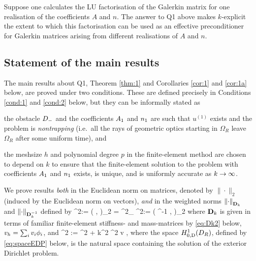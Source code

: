 
Suppose one calculates the LU factorisation of the Galerkin matrix for one realisation of the coefficients $A$ and $n$. The answer to Q1 above makes $k$-explicit the extent to which this factorisation can be used as an effective preconditioner for Galerkin matrices arising from different realisations of $A$ and $n$.

\subsection{Statement of the main results}\label{sec:main}
The main results about Q1, Theorem \ref{thm:1} and Corollaries \ref{cor:1} and \ref{cor:1a} below, are proved under two conditions. These are defined precisely in Conditions \ref{cond:1} and \ref{cond:2} below, but they can be informally stated as 
\bit
\item the obstacle $D_{-}$ and the coefficients $A_{1}$ and $n_{1}$ are such that $u^{(1)}$ exists and the problem is \emph{nontrapping} (i.e.~all the rays of geometric optics starting in $\Omega_R$ leave $\Omega_R$ after some uniform time), and
\item the meshsize $h$ and polynomial degree $p$ in the finite-element method are chosen to depend on $k$ to ensure that the 
finite-element solution to the problem with coefficients $A_{1}$ and $n_{1}$ exists, is unique, and 
is uniformly accurate as $k\rightarrow \infty$. 
\eit 

We prove results \emph{both} in the Euclidean norm on matrices, denoted by $\|\cdot\|_2$ (induced by the Euclidean norm on vectors), \emph{and} in the weighted norms $\NDmatk{\cdot}$ and $\NDmatkI{\cdot}$ defined by 
\beq\label{eq:Dk}
\NDmatk{\bv}^2:= \big( \Dmatk \bv, \bv\big)_2 = %
^2_{\HokDR}
\quad \tand
\quad \NDmatkI{\bv}^2:= \big( \Dmatk^{-1} \bv, \bv\big)_2 %
\eeq
where $\mathbf{D}_{k}$ is given in terms of familiar finite-element stiffness- and mass-matrices by \eqref{eq:Dk2} below, 
$v_{h} =\sum_i v_{i} \phi_{i}$, and 
\beq\label{eq:1knorm}
^2 := ^2 + k^2 ^2 \quad \tfor v \in \HozDDR,
\eeq
where the space $\HozDDR$, defined by \eqref{eq:spaceEDP} below, is the natural space containing the solution of the exterior Dirichlet problem. 

